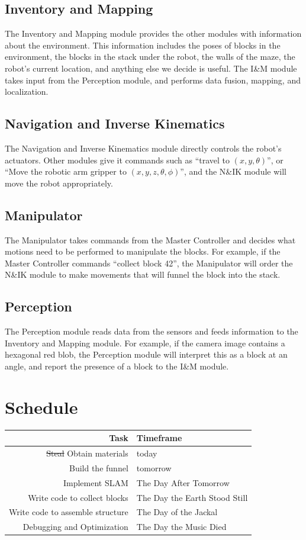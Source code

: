 \documentclass[letterpaper,11pt]{article}
\begin{document}
\subsection{Inventory and Mapping}
The Inventory and Mapping module provides the other modules with information about the environment.
This information includes the poses of blocks in the environment,
the blocks in the stack under the robot,
the walls of the maze,
the robot's current location,
and anything else we decide is useful.
The I\&M module takes input from the Perception module, and performs data fusion, mapping, and localization.

\subsection{Navigation and Inverse Kinematics}
The Navigation and Inverse Kinematics module directly controls the robot's actuators.
Other modules give it commands such as ``travel to $(x, y, \theta)$'',
or ``Move the robotic arm gripper to $(x, y, z, \theta, \phi)$'',
and the N\&IK module will move the robot appropriately.

\subsection{Manipulator}
The Manipulator takes commands from the Master Controller
and decides what motions need to be performed to manipulate the blocks.
For example, if the Master Controller commands ``collect block 42'',
the Manipulator will order the N\&IK module to make movements that will funnel the block into the stack.

\subsection{Perception}
The Perception module reads data from the sensors and feeds information to the Inventory and Mapping module.
For example, if the camera image contains a hexagonal red blob,
the Perception module will interpret this as a block at an angle,
and report the presence of a block to the I\&M module.

\section{Schedule}
\begin{tabular}{r | l}
Task & Timeframe\\
\hline
\sout{Steal} Obtain materials    & today \\
Build the funnel                 & tomorrow \\
Implement SLAM                   & The Day After Tomorrow \\
Write code to collect blocks     & The Day the Earth Stood Still \\
Write code to assemble structure & The Day of the Jackal \\
Debugging and Optimization       & The Day the Music Died
\end{tabular}
\end{document}
